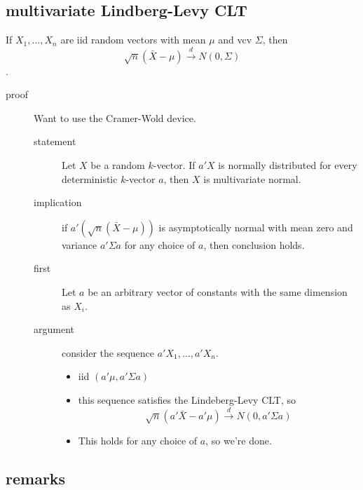 \subsection{multivariate Lindberg-Levy CLT}
\label{sec-3-4}

     If $X_1,\dots,X_n$ are iid random vectors with mean $\mu$ and vcv
     $\Sigma$, then $$\sqrt{n}(\bar X - \mu) \xrightarrow{d}
     N(0,\Sigma)$$.
\begin{description}
\item[proof] Want to use the Cramer-Wold device.
\begin{description}
\item[statement] Let $X$ be a random $k$-vector.  If $a'X$
                  is normally distributed for every deterministic
                  $k$-vector $a$, then $X$ is multivariate normal.
\item[implication] if $a'(\sqrt{n}(\bar X - \mu))$ is
                  asymptotically normal with mean zero and variance
                  $a'\Sigma a$ for any choice of $a$, then conclusion
                  holds.
\item[first] Let $a$ be an arbitrary vector of constants
                           with the same dimension as $X_i$.
\item[argument] consider the sequence $a'X_1, \dots,
                              a'X_n$.
\begin{itemize}
\item iid $(a'\mu, a'\Sigma a)$
\item this sequence satisfies the Lindeberg-Levy CLT,
                    so $$\sqrt{n}(a'\bar X - a'\mu) \xrightarrow{d}
                    N(0,a'\Sigma a)$$
\item This holds for any choice of $a$, so we're done.
\end{itemize}
\end{description}
\end{description}
\subsection{remarks}
\label{sec-3-5}

